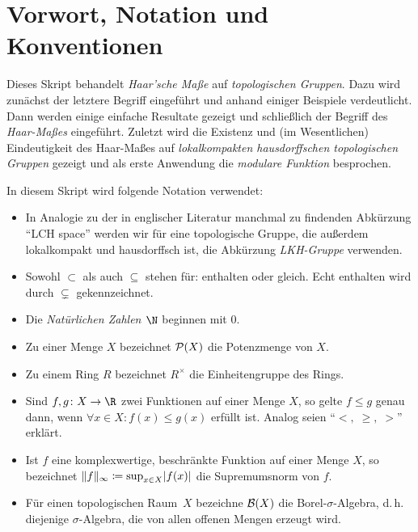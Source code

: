 
\chapter{Vorwort, Notation und Konventionen}
Dieses Skript behandelt \emph{Haar'sche Maße} auf \emph{topologischen Gruppen}.
Dazu wird zunächst der letztere Begriff eingeführt und anhand einiger Beispiele
verdeutlicht. Dann werden einige einfache Resultate gezeigt und schließlich der
Begriff des \emph{Haar-Maßes} eingeführt. Zuletzt wird die Existenz und
(im Wesentlichen) Eindeutigkeit des Haar-Maßes auf \emph{lokalkompakten
hausdorffschen topologischen Gruppen} gezeigt und als erste Anwendung die
\emph{modulare Funktion} besprochen.


\bigskip
In diesem Skript wird folgende Notation verwendet:
\begin{itemize}
    \item
        In Analogie zu der in englischer Literatur manchmal zu findenden
        Abkürzung \enquote{LCH space} werden wir für eine topologische Gruppe,
        die außerdem lokalkompakt und hausdorffsch ist, die Abkürzung
        \emph{LKH-Gruppe} verwenden.
        
    \item
        Sowohl $\subset$ als auch $\subseteq$ stehen für: enthalten oder gleich.
        Echt enthalten wird durch $\subsetneq$ gekennzeichnet.
    
    \item
        Die \emph{Natürlichen Zahlen $\N$} beginnen mit $0$.
        
    \item
        Zu einer Menge $X$ bezeichnet $\operatorname{\mathcal{P}}(X)$ die Potenzmenge von $X$.
    
    \item
        Zu einem Ring $R$ bezeichnet $R^\times$ die Einheitengruppe des Rings.
        
    \item
        Sind $f,g\colon X\to\R$ zwei Funktionen auf einer Menge $X$, so gelte
        $f\leq g$ genau dann, wenn $\forall x\in X\colon f(x) \leq g(x)$ erfüllt
        ist. Analog seien \enquote{$<,\;\geq,\;>$} erklärt.
        
    \item
        Ist $f$ eine komplexwertige, beschränkte Funktion auf einer Menge $X$,
        so bezeichnet $\lVert f\rVert_\infty \coloneqq \sup_{x\in X} \lvert f(x) \rvert$ die
        Supremumsnorm von $f$.
        
    \item
        Für einen topologischen Raum~$X$ bezeichne $\mathcal{B}(X)$ die
        Borel-$\sigma$-Algebra, d.\,h. diejenige $\sigma$-Algebra, die von allen
        offenen Mengen erzeugt wird.
\end{itemize}


